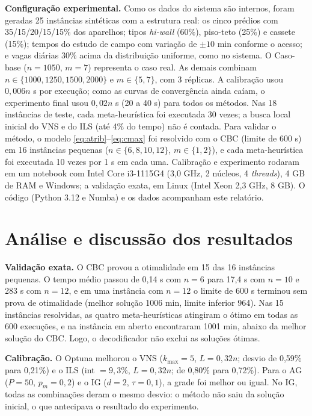 \textbf{Configuração experimental.} Como os dados do sistema são internos, foram geradas 25 instâncias sintéticas com a estrutura real: os cinco prédios com 35/15/20/15/15\% dos aparelhos; tipos \textit{hi-wall} (60\%), piso-teto (25\%) e cassete (15\%); tempos do estudo de campo com variação de $\pm10$ min conforme o acesso; e vagas diárias 30\% acima da distribuição uniforme, como no sistema. O Caso-base ($n=1050$, $m=7$) representa o caso real. As demais combinam $n\in\{1000,1250,1500,2000\}$ e $m\in\{5,7\}$, com 3 réplicas. A calibração usou $0{,}006n$ s por execução; como as curvas de convergência ainda caíam, o experimento final usou $0{,}02n$ s (20 a 40 s) para todos os métodos. Nas 18 instâncias de teste, cada meta-heurística foi executada 30 vezes; a busca local inicial do VNS e do ILS (até 4\% do tempo) não é contada. Para validar o método, o modelo \eqref{eq:atrib}--\eqref{eq:cmax} foi resolvido com o CBC (limite de 600 s) em 16 instâncias pequenas ($n\in\{6,8,10,12\}$, $m\in\{1,2\}$), e cada meta-heurística foi executada 10 vezes por 1 s em cada uma. Calibração e experimento rodaram em um notebook com Intel Core i3-1115G4 (3,0 GHz, 2 núcleos, 4 \textit{threads}), 4 GB de RAM e Windows; a validação exata, em Linux (Intel Xeon 2,3 GHz, 8 GB). O código (Python 3.12 e Numba) e os dados acompanham este relatório.

\section{Análise e discussão dos resultados}

\textbf{Validação exata.} O CBC provou a otimalidade em 15 das 16 instâncias pequenas. O tempo médio passou de 0,14 s com $n=6$ para 17,4 s com $n=10$ e 283 s com $n=12$, e em uma instância com $n=12$ o limite de 600 s terminou sem prova de otimalidade (melhor solução 1006 min, limite inferior 964). Nas 15 instâncias resolvidas, as quatro meta-heurísticas atingiram o ótimo em todas as 600 execuções, e na instância em aberto encontraram 1001 min, abaixo da melhor solução do CBC. Logo, o decodificador não exclui as soluções ótimas.

\textbf{Calibração.} O Optuna melhorou o VNS ($k_{\max}=5$, $L=0{,}32n$; desvio de 0,59\% para 0,21\%) e o ILS (int $=9{,}3\%$, $L=0{,}32n$; de 0,80\% para 0,72\%). Para o AG ($P=50$, $p_m=0{,}2$) e o IG ($d=2$, $\tau=0{,}1$), a grade foi melhor ou igual. No IG, todas as combinações deram o mesmo desvio: o método não saiu da solução inicial, o que antecipava o resultado do experimento.

